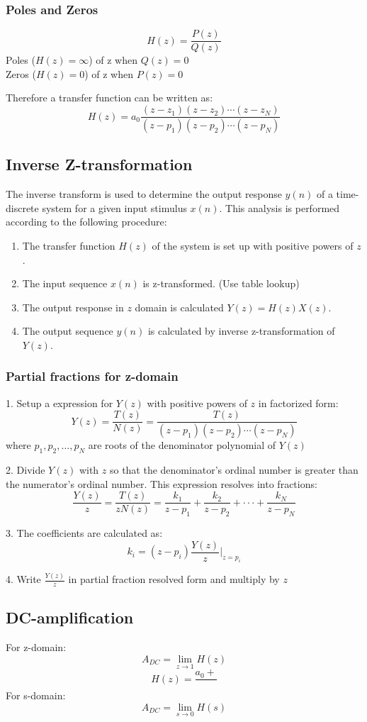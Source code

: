 \subsubsection{Poles and Zeros}
$$H(z)=\frac{P(z)}{Q(z)}$$
Poles ($H(z)=\infty$) of z when $Q(z)=0$\\
Zeros ($H(z)=0$) of z when $P(z)=0$

Therefore a transfer function can be written as:
$$H(z)=a_0\frac{(z-z_1)(z-z_2)\cdots(z-z_N)}{(z-p_1)(z-p_2)\cdots(z-p_N)}$$

\subsection{Inverse Z-transformation}
The inverse transform is used to determine the output response $y(n)$ of a time-discrete system for a given input stimulus $x(n)$. This analysis is performed according to the following procedure:
\begin{enumerate}
  \item The transfer function $H(z)$ of the system is set up with positive powers of $z$.
  \item The input sequence $x(n)$ is z-transformed. (Use table lookup)
  \item The output response in $z$ domain is calculated $Y(z)=H(z)X(z)$.
  \item The output sequence $y(n)$ is calculated by inverse z-transformation of $Y(z)$.
\end{enumerate}

\subsubsection{Partial fractions for z-domain}
1. Setup a expression for $Y(z)$ with positive powers of $z$ in factorized form:
$$Y(z)=\frac{T(z)}{N(z)}=\frac{T(z)}{(z-p_1)(z-p_2)\cdots(z-p_N)}$$
where $p_1,p_2,\dots,p_N$ are roots of the denominator polynomial of $Y(z)$

2. Divide $Y(z)$ with $z$ so that the denominator's ordinal number is greater than the numerator's ordinal number. This expression resolves into fractions:
$$\frac{Y(z)}{z}=\frac{T(z)}{z N(z)}=\frac{k_{1}}{z-p_{1}}+\frac{k_{2}}{z-p_{2}}+\cdot\cdot\cdot+\frac{k_{N}}{z-p_{N}}$$

3. The coefficients are calculated as:
$$k_{i}=(z-p_{i})\frac{Y(z)}{z}\vert_{z=p_{i}}$$

4. Write $\frac{Y(z)}{z}$ in partial fraction resolved form and multiply by $z$
\subsection{DC-amplification}
For z-domain:
$$A_{DC}=\lim_{z\to 1}H(z)$$
$$H(z)=\frac{a_0+}{}$$
For s-domain:
$$A_{DC}=\lim_{s\to 0}H(s)$$
